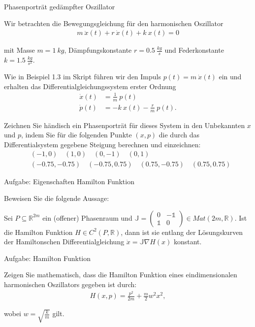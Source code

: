 \documentclass[letterpaper,10pt,english]{jupyterBook}
\begin{document}
\begin{emphBox}{}{}{Phasenporträt gedämpfter Oszillator}

\par
Wir betrachten die Bewegungsgleichung für den harmonischen Oszillator
\begin{align*}
m ~ \ddot x(t) + r ~ \dot x(t) + k ~ x(t) = 0
\end{align*}
\par
mit Masse \(m = 1  ~ kg\), Dämpfungskonstante \(r = 0.5 ~ \frac{kg}{s}\) und Federkonstante \(k = 1.5 ~ \frac{kg}{s^2}\).

\par
Wie in Beispiel 1.3 im Skript führen wir den Impuls \(p(t) = m ~ \dot x(t)\) ein und erhalten das Differentialgleichungssystem erster Ordnung
\begin{align*}
\dot x(t) &= \frac{1}{m} ~ p(t)\\
\dot p(t) &= -k ~ x(t) - \frac{r}{m} ~ p(t).
\end{align*}
\par
Zeichnen Sie händisch ein Phasenporträt für dieses System in den Unbekannten \(x\) und \(p\), indem Sie für die folgenden Punkte \((x,p)\) die durch das Differentialsystem gegebene Steigung berechnen und einzeichnen:
\begin{align*}
&(-1, 0) \quad  (1, 0) \quad (0, -1) \quad  (0, 1)\\
&(-0.75, -0.75) \quad  (-0.75, 0.75) \quad (0.75, -0.75) \quad (0.75, 0.75)
\end{align*}\end{emphBox}

\begin{emphBox}{}{}{Aufgabe: Eigenschaften Hamilton Funktion}

\par
Beweisen Sie die folgende Aussage:

\par
Sei \(P \subseteq \mathbb{R}^{2m}\) ein (offener) Phasenraum und \(\mathbb{J} = \begin{pmatrix} 0 & - 𝟙 \\ 𝟙 & 0 \end{pmatrix} \in Mat(2m, \mathbb{R})\). Ist die Hamilton Funktion \(H \in C^2(P, \mathbb{R})\), dann ist sie entlang der Lösungskurven der Hamiltonschen Differentialgleichung \(\dot x = \mathbb{J} \nabla H(x)\) konstant.
\end{emphBox}

\begin{emphBox}{}{}{Aufgabe: Hamilton Funktion}

\par
Zeigen Sie mathematisch, dass die Hamilton Funktion eines eindimensionalen harmonischen Oszillators gegeben ist durch:
\begin{align*}
H(x,p) = \frac{p^2}{2m} + \frac{m}{2} w^2 x^2,
\end{align*}
\par
wobei \(w = \sqrt{\frac{k}{m}}\) gilt.
\end{emphBox}
\end{document}
